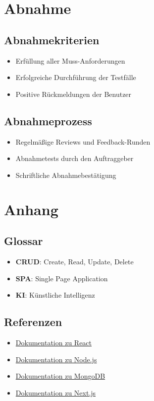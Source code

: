 \documentclass[a4paper,12pt]{article}
\begin{document}
\section{Abnahme}

\subsection{Abnahmekriterien}
\begin{itemize}
    \item Erfüllung aller Muss-Anforderungen
    \item Erfolgreiche Durchführung der Testfälle
    \item Positive Rückmeldungen der Benutzer
\end{itemize}

\subsection{Abnahmeprozess}
\begin{itemize}
    \item Regelmäßige Reviews und Feedback-Runden
    \item Abnahmetests durch den Auftraggeber
    \item Schriftliche Abnahmebestätigung
\end{itemize}

\section{Anhang}

\subsection{Glossar}
\begin{itemize}
    \item \textbf{CRUD}: Create, Read, Update, Delete
    \item \textbf{SPA}: Single Page Application
    \item \textbf{KI}: Künstliche Intelligenz
\end{itemize}

\subsection{Referenzen}
\begin{itemize}
    \item \href{https://reactjs.org/docs/getting-started.html}{Dokumentation zu React}
    \item \href{https://nodejs.org/en/docs/}{Dokumentation zu Node.js}
    \item \href{https://docs.mongodb.com/}{Dokumentation zu MongoDB}
    \item \href{https://nextjs.org/docs}{Dokumentation zu Next.js}
\end{itemize}
\end{document}
